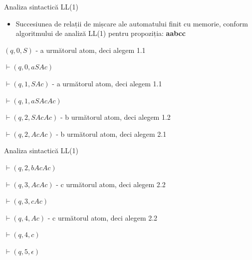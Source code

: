 \documentclass[pdf]{beamer}
\begin{document}
\begin{frame}{Analiza sintactică LL(1)}

\begin{itemize}
\item
Succesiunea de relații de mișcare ale automatului finit cu memorie, conform algoritmului de analiză LL(1) pentru propoziția: \textbf{aabcc}
\end{itemize}

$(q, 0, S) $ \hspace{2cm} - a următorul atom, deci alegem 1.1

$\vdash (q, 0, aSAc)$

$\vdash (q, 1, SAc)$ \hspace{1.2cm} - a următorul atom, deci alegem 1.1

$\vdash (q, 1, aSAcAc) $

$\vdash (q, 2, SAcAc)$ \hspace{0.8cm} - b următorul atom, deci alegem 1.2

$\vdash (q, 2, AcAc)$ \hspace{1cm} - b următorul atom, deci alegem 2.1

\end{frame}



\begin{frame}{Analiza sintactică LL(1)}

$\vdash (q, 2, bAcAc)$

$\vdash (q, 3, AcAc)$ \hspace{1.2cm} - c următorul atom, deci alegem 2.2

$\vdash (q, 3, cAc)$

$\vdash (q, 4, Ac)$ \hspace{1.6cm} - c următorul atom, deci alegem 2.2

$\vdash (q, 4, c)$ 

$\vdash (q, 5, \epsilon)$

\end{frame}
\end{document}
